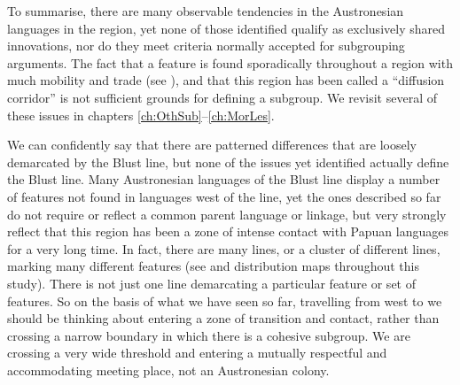 To summarise, there are many observable tendencies in the Austronesian languages in the region,
yet none of those identified qualify as exclusively shared innovations,
nor do they meet criteria normally accepted for subgrouping arguments.
The fact that a feature is found sporadically throughout a region with much mobility
and trade (see ),
and that this region has been called a “diffusion corridor” is not sufficient grounds for defining a subgroup.
We revisit several of these issues in chapters \ref{ch:OthSub}--\ref{ch:MorLes}.

We can confidently say that there are patterned differences that are loosely demarcated by the Blust
line, but none of the issues yet identified actually define the Blust line.
Many Austronesian languages  of the Blust line display a number of features not found in languages
west of the line,
yet the ones described so far do not require or reflect a common parent language or linkage,
but very strongly reflect that this region has been a zone of intense contact with Papuan languages for
a very long time.
In fact, there are many lines,
or a cluster of different lines,
marking many different features (see 
and distribution maps throughout this study).
There is not just one line
demarcating a particular feature or set of features.
So on the basis of what we have seen so far,
travelling from west to  we should be thinking about entering a zone of transition
and contact, rather than crossing a narrow boundary in which there is a cohesive subgroup.
We are crossing a very wide threshold
and entering a mutually respectful
and accommodating meeting place,
not an Austronesian colony.

